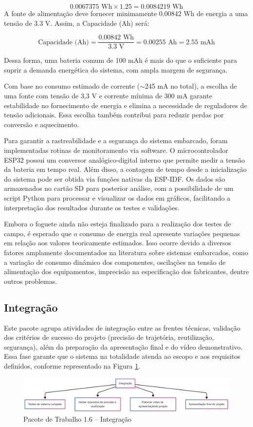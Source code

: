 \begin{equation}
0.0067375 \text{ Wh} \times 1.25 = 0.0084219 \text{ Wh}
\end{equation}
A fonte de alimentação deve fornecer minimamente 0.00842 Wh de energia a uma tensão de 3.3 V. Assim, a Capacidade (Ah) será:


\begin{equation}
\text{Capacidade (Ah)} = \frac{0.00842 \text{ Wh}}{3.3 \text{ V}} = 0.00255 \text{ Ah} = 2.55 \text{ mAh}
\end{equation}

Dessa forma, uma bateria comum de 100 mAh é mais do que o suficiente para suprir a demanda energética do sistema, com ampla margem de segurança.

Com base no consumo estimado de corrente ($\sim$245 mA no total), a escolha de uma fonte com tensão de 3,3 V e corrente mínima de 300 mA garante estabilidade no fornecimento de energia e elimina a necessidade de reguladores de tensão adicionais. Essa escolha também contribui para reduzir perdas por conversão e aquecimento.

Para garantir a rastreabilidade e a segurança do sistema embarcado, foram implementadas rotinas de monitoramento via software. O microcontrolador ESP32 possui um conversor analógico-digital interno que permite medir a tensão da bateria em tempo real. Além disso, a contagem de tempo desde a inicialização do sistema pode ser obtida via funções nativas da ESP-IDF. Os dados são armazenados no cartão SD para posterior análise, com a possibilidade de um script Python para processar e visualizar os dados em gráficos, facilitando a interpretação dos resultados durante os testes e validações.

Embora o foguete ainda não esteja finalizado para a realização dos testes de campo, é esperado que o consumo de energia real apresente variações pequenas em relação aos valores teoricamente estimados. Isso ocorre devido a diversos fatores amplamente documentados na literatura sobre sistemas embarcados, como a variação de consumo dinâmico dos componentes, oscilações na tensão de alimentação dos equipamentos, imprecisão na especificação dos fabricantes, dentre outros problemas.

\newpage

\subsection{Integração}


Este pacote agrupa atividades de integração entre as frentes técnicas, validação dos critérios de sucesso do projeto (precisão de trajetória, reutilização, segurança), além da preparação da apresentação final e do vídeo demonstrativo. Essa fase garante que o sistema na totalidade atenda ao escopo e aos requisitos definidos, conforme representado na Figura \ref{fig_eap_integracao}.

\begin{figure}[!h]
	\centering
\includegraphics[width=15cm]{figuras/eap_integracao.png}
	\caption{Pacote de Trabalho 1.6 – Integração}
	\label{fig_eap_integracao}  
\end{figure}
